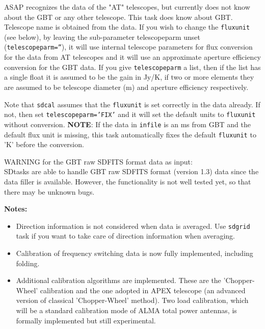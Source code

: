 ASAP recognizes the data of the "AT" telescopes, but currently
does not know about the GBT or any other telescope. This task
does know about GBT. Telescope name is obtained from the data.
If you wish to change the {\tt fluxunit} (see below), by leaving
the sub-parameter telescopeparm unset ({\tt telescopeparm=''}),
it will use internal telescope parameters for
flux conversion for the data from AT telescopes and it will use an
approximate aperture efficiency conversion for the GBT data.
If you give {\tt telescopeparm} a list, then if the list has a single float it
is assumed to be the gain in Jy/K, if two or more elements they are assumed
to be telescope diameter (m) and aperture efficiency
respectively.

Note that {\tt sdcal} assumes that the {\tt fluxunit} is set correctly in
the data already.  If not, then set {\tt telescopeparm='FIX'} and it
will set the default units to {\tt fluxunit} without conversion.
{\bf NOTE}: If the data in {\tt infile} is an ms from GBT and the default flux
unit is missing, this task automatically fixes the default {\tt fluxunit}
to 'K' before the conversion.

WARNING for the GBT raw SDFITS format data as input:\\
SDtasks are able to handle GBT raw SDFITS format (version 1.3) data since the 
data filler is available. However, the functionality is not well 
tested yet, so that there may be unknown bugs. 

\medskip
{\bf Notes:}
 \begin{itemize}
  \item Direction information is not considered when data is averaged. 
Use {\tt sdgrid} task if you want to take care of direction information 
when averaging.
  \item Calibration of frequency switching data is now fully implemented, including folding.
  \item Additional calibration algorithms are implemented. These are the
'Chopper-Wheel' calibration and the one adopted in APEX telescope (an advanced version of classical 'Chopper-Wheel' method). Two load
calibration, which will be a standard calibration mode of ALMA total
power antennas, is formally implemented but still experimental.
\end{itemize}

